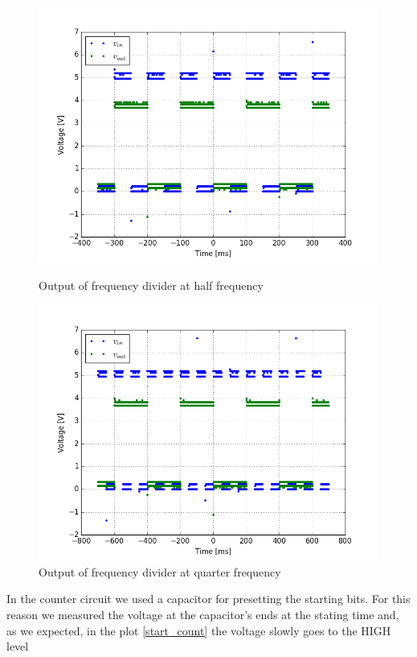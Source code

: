 \begin{figure}[H]
\centering
\begin{minipage}{.48\textwidth}
\includegraphics[width=\textwidth]{11/freq_div_m.png}
\caption{Output of frequency divider at half frequency}\label{freq_div_m}
\end{minipage}\hfill
\begin{minipage}{.48\textwidth}
\centering
\includegraphics[width=\textwidth]{11/freq_div_q.png}
\caption{Output of frequency divider at quarter frequency}\label{freq_div_q}
\end{minipage}
\end{figure}
In the counter circuit we used a capacitor for presetting the starting bits. For this reason we measured the voltage at the capacitor's ends at the stating time and, as we expected, in the plot \ref{start_count} the voltage slowly goes to the HIGH level
